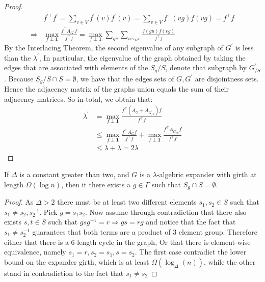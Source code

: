 \begin{proof}
\begin{equation*}
    \begin{split}
     &  f^{\prime \top}f^{\prime}   = \sum_{v \in V}f^{\prime}\left( v \right)f^{\prime}\left( v \right)   =   \sum_{v \in V } f^{\top}\left( vg \right)f\left( vg \right) = f^{\top}f \\
     \Rightarrow  &  \max_{f \perp \mathbf{1}} { \frac{f^{\top}A_{G^{\prime}} f  }{ f^{\top}f}} =\max_{f \perp \mathbf{1}} { \sum_{gv}\sum_{ u\sim_{G} v }\frac{f\left( gu \right) f \left( vg \right)  }{ f^{\top}f}} 
    \end{split}
  \end{equation*}
  By the Interlacing Theorem, \cite{HAEMERS1995593} the second eigenvalue of any subgraph of $G^{\prime}$ is less than the $\lambda^{\prime}$, In particular, the eigenvalue of the graph obtained by taking the edges that are associated with elements of the $ S_{g} / S $, denote that subgraph by $G^{\prime}_{ / S}$. Because $S_{g} / S \cap S = \emptyset $, we have that the edges sets of $G, G^{\prime}$ are disjointness sets. Hence the adjacency matrix of the graphs union equals the sum of their adjacency matrices. So in total, we obtain that:  
    \begin{equation*}
    \begin{split}
      \lambda^{\prime} &= \max_{f \perp \mathbf{1}} { \frac{f^{\top} \left( A_{G} + A_{G^{\prime}_{/S}} \right) f  }{ f^{\top}f}} \\
      & \le  \max_{f \perp \mathbf{1}} { \frac{f^{\top}A_{G} f  }{ f^{\top}f}} +  \max_{f \perp \mathbf{1}} { \frac{f^{\top}A_{G^{\prime}_{/S}} f  }{ f^{\top}f}} \\
      & \le \lambda + \lambda = 2\lambda
    \end{split}
  \end{equation*} 
  \end{proof} 
  \begin{claim} \label{claim:using-ram}  If $\Delta$ is a constant greater than two, and $G$ is a $\lambda$-algebric expander with girth at length $\Omega\left( \log n \right)$, then it there exists a $g \in \Gamma$ such that $S_{g}\cap S = \emptyset$.  
    \end{claim}
  \begin{proof} As $\Delta > 2 $ there must be at least two different elements $s_{1},s_{2} \in S$  such that $s_{1} \neq s_{2}, s_{2}^{-1}$. Pick $g = s_{1}s_{2}$. Now assume through contradiction that there also exists $s,t \in S$ such that $gsg^{-1} = r \Rightarrow gs = rg$ and notice that the fact that $s_{1}\neq s_{2}^{-1}$ guarantees that both terms are a product of $3$ element group. Therefore either that there is a $6$-length cycle in the graph, Or that there is element-wise equivalence, namely $s_{1} = r, s_{2} = s_{1}, s=s_{2}$. The first case contradict the lower bound on the expander girth, which is at least $\Omega \left( \log_{\Delta}(n) \right)$, while the other stand in contradiction to the fact that $s_{1} \neq s_{2}$ \end{proof}  
